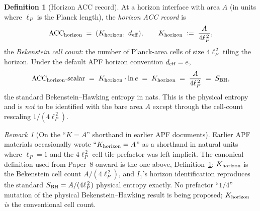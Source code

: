 \documentclass[11pt]{article}
\theoremstyle{plain}
\theoremstyle{definition}
\newtheorem{definition}[theorem]{Definition}
\theoremstyle{remark}
\newtheorem{remark}[theorem]{Remark}
\begin{document}
\begin{definition}[Horizon ACC record]\label{def:ACC_horizon}
At a horizon interface with area $A$ (in units where $\ell_P$ is the Planck length), the \emph{horizon ACC record} is
\[
  \mathrm{ACC}_{\rm horizon} \;=\; (K_{\rm horizon},\ d_{\rm eff}),
  \qquad
  K_{\rm horizon} \;:=\; \frac{A}{4\ell_P^{\,2}},
\]
the \emph{Bekenstein cell count}: the number of Planck-area cells of size $4\ell_P^{\,2}$ tiling the horizon.  Under the default APF horizon convention $d_{\rm eff} = e$,
\[
  \mathrm{ACC}_{\rm horizon}\text{-scalar}
  \;=\; K_{\rm horizon}\cdot \ln e
  \;=\; K_{\rm horizon}
  \;=\; \frac{A}{4\ell_P^{\,2}}
  \;=\; S_{\rm BH},
\]
the standard Bekenstein--Hawking entropy in nats.  This is the physical entropy and is \emph{not} to be identified with the bare area $A$ except through the cell-count rescaling $1/(4\ell_P^{\,2})$.
\end{definition}

\begin{remark}[On the ``$K = A$'' shorthand in earlier APF documents]\label{rem:K_vs_A}
Earlier APF materials occasionally wrote ``$K_{\rm horizon} = A$'' as a shorthand in natural units where $\ell_P = 1$ and the $4\ell_P^{\,2}$ cell-tile prefactor was left implicit.  The canonical definition used from Paper~8 onward is the one above, Definition~\ref{def:ACC_horizon}: $K_{\rm horizon}$ is the Bekenstein cell count $A/(4\ell_P^{\,2})$, and $I_1$'s horizon identification reproduces the standard $S_{\rm BH} = A/(4\ell_P^{\,2})$ physical entropy exactly.  No prefactor ``$1/4$'' mutation of the physical Bekenstein--Hawking result is being proposed; $K_{\rm horizon}$ \emph{is} the conventional cell count.
\end{remark}
\end{document}
